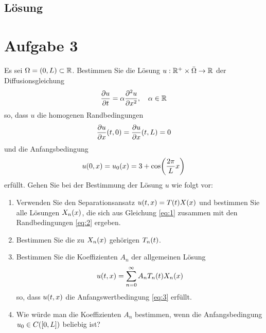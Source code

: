 \documentclass{exercise}
\begin{document}
    \subsection*{Lösung}


    \section*{Aufgabe 3}
    
    \begin{problem}
        Es sei \(\Omega = \parentheses*{0, L} \subset \R\).
        Bestimmen Sie die Lösung \(u: \R^+ \times \bar{\Omega} \to \R\) der Diffusionsgleichung
        \begin{equation}\label{eq:1}
            \frac{\partial u}{\partial t} = \alpha\frac{\partial^2 u}{\partial x^2}, \quad \alpha \in \R
        \end{equation}
        so, dass \(u\) die homogenen Randbedingungen
        \begin{equation}\label{eq:2}
            \frac{\partial u}{\partial x}\parentheses*{t, 0} = \frac{\partial u}{\partial x}\parentheses*{t, L} = 0
        \end{equation}
        und die Anfangsbedingung
        \begin{equation}\label{eq:3}
            u\parentheses*{0, x} = u_0\parentheses*{x} = 3 + \cos\parentheses*{\frac{2\pi}{L}x}
        \end{equation}
        erfüllt.
        Gehen Sie bei der Bestimmung der Lösung \(u\) wie folgt vor:
        \begin{enumerate}
            \item Verwenden Sie den Separationsansatz \(u\parentheses*{t, x} = T\parentheses*{t}X\parentheses*{x}\) und bestimmen Sie alle Lösungen \(X_n\parentheses*{x}\), die sich aus Gleichung \eqref{eq:1} zusammen mit den Randbedingungen \eqref{eq:2} ergeben.
            \item Bestimmen Sie die zu \(X_n\parentheses*{x}\) gehörigen \(T_n\parentheses*{t}\).
            \item Bestimmen Sie die Koeffizienten \(A_n\) der allgemeinen Lösung
            \[
                u\parentheses*{t, x} = \sum_{n = 0}^\infty A_n T_n\parentheses*{t}X_n\parentheses*{x}
            \]
            so, dass \(u\parentheses*{t, x}\) die Anfangswertbedingung \eqref{eq:3} erfüllt.
            \item Wie würde man die Koeffizienten \(A_n\) bestimmen, wenn die Anfangsbedingung \(u_0 \in C\parentheses*{\brackets*{0, L}}\) beliebig ist?
        \end{enumerate}
    \end{problem}
    
\end{document}
